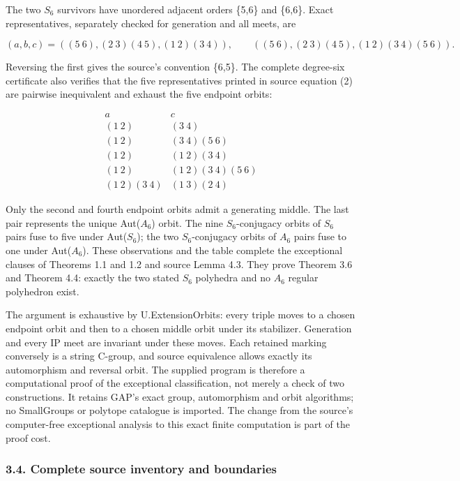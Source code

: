 \documentclass[
  11pt,
  a4paper,
]{article}
\begin{document}
The two \(S_6\) survivors have unordered adjacent orders \{5,6\} and
\{6,6\}. Exact representatives, separately checked for generation and
all meets, are

\[
 (a,b,c)=((5\ 6),(2\ 3)(4\ 5),(1\ 2)(3\ 4)),\qquad
 ((5\ 6),(2\ 3)(4\ 5),(1\ 2)(3\ 4)(5\ 6)).
 \tag{CPI11}
\]

Reversing the first gives the source's convention \{6,5\}. The complete
degree-six certificate also verifies that the five representatives
printed in source equation (2) are pairwise inequivalent and exhaust the
five endpoint orbits:

\[
 \begin{array}{c|c}
 a&c\\\hline
 (1\ 2)&(3\ 4)\\
 (1\ 2)&(3\ 4)(5\ 6)\\
 (1\ 2)&(1\ 2)(3\ 4)\\
 (1\ 2)&(1\ 2)(3\ 4)(5\ 6)\\
 (1\ 2)(3\ 4)&(1\ 3)(2\ 4)
 \end{array}
 \tag{CPI12}
\]

Only the second and fourth endpoint orbits admit a generating middle.
The last pair represents the unique Aut(\(A_6\)) orbit. The nine
\(S_6\)-conjugacy orbits of \(S_6\) pairs fuse to five under
Aut(\(S_6\)); the two \(S_6\)-conjugacy orbits of \(A_6\) pairs fuse to
one under Aut(\(A_6\)). These observations and the table complete the
exceptional clauses of Theorems 1.1 and 1.2 and source Lemma 4.3. They
prove Theorem 3.6 and Theorem 4.4: exactly the two stated \(S_6\)
polyhedra and no \(A_6\) regular polyhedron exist.

The argument is exhaustive by U.ExtensionOrbits: every triple moves to a
chosen endpoint orbit and then to a chosen middle orbit under its
stabilizer. Generation and every IP meet are invariant under these
moves. Each retained marking conversely is a string C-group, and source
equivalence allows exactly its automorphism and reversal orbit. The
supplied program is therefore a computational proof of the exceptional
classification, not merely a check of two constructions. It retains
GAP's exact group, automorphism and orbit algorithms; no SmallGroups or
polytope catalogue is imported. The change from the source's
computer-free exceptional analysis to this exact finite computation is
part of the proof cost.

\subsubsection{3.4. Complete source inventory and
boundaries}\label{complete-source-inventory-and-boundaries}
\end{document}
